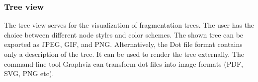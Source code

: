 \documentclass[a4paper,11pt]{article}
\begin{document}
 \subsubsection{Tree view}
 
 The tree view serves for the visualization of fragmentation trees. 
 The user has the choice between different node styles and  color schemes. 
 The shown tree can be exported as JPEG, GIF,  and PNG. 
 Alternatively, the Dot file format contains only a description of the tree. 
 It can be used to render the tree externally. The command-line tool Graphviz can 
 transform dot files into image formats (PDF, SVG, PNG etc).
 
 
\end{document}
